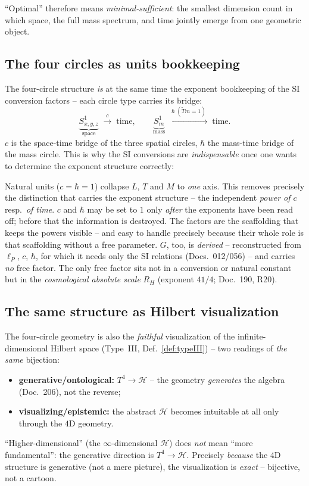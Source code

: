 \noindent
\enquote{Optimal} therefore means \emph{minimal-sufficient}: the smallest
dimension count in which space, the full mass spectrum, and time jointly emerge
from one geometric object.

\subsection{The four circles as units bookkeeping}

The four-circle structure \emph{is} at the same time the exponent bookkeeping of
the SI conversion factors -- each circle type carries its bridge:
\[
  \underbrace{S^1_{x,y,z}}_{\text{space}}
  \;\xrightarrow{\;c\;}\;\text{time},
  \qquad
  \underbrace{S^1_m}_{\text{mass}}
  \;\xrightarrow{\;\hbar\;(\tilde T m=1)\;}\;\text{time}.
\]
$c$ is the space-time bridge of the three spatial circles, $\hbar$ the mass-time
bridge of the mass circle. This is why the SI conversions are \emph{indispensable}
once one wants to determine the exponent structure correctly:

\begin{remark}
Natural units ($c=\hbar=1$) collapse $L$, $T$ and $M$ to \emph{one} axis. This
removes precisely the distinction that carries the exponent structure -- the
independent \emph{power of $c$} resp.\ \emph{of time}. $c$ and $\hbar$ may be set
to $1$ only \emph{after} the exponents have been read off; before that the
information is destroyed. The factors are the scaffolding that keeps the powers
visible -- and easy to handle precisely because their whole role is that
scaffolding without a free parameter. $G$, too, is \emph{derived} -- reconstructed
from $\ell_P$, $c$, $\hbar$, for which it needs only the SI relations
(Docs.~012/056) -- and carries \emph{no} free factor. The only free factor sits
not in a conversion or natural constant but in the \emph{cosmological absolute
scale} $R_H$ (exponent $41/4$; Doc.~190, R20).
\end{remark}

\subsection{The same structure as Hilbert visualization}

The four-circle geometry is also the \emph{faithful} visualization of the
infinite-dimensional Hilbert space (Type~III, Def.~\ref{def:typeIII}) -- two
readings of \emph{the same} bijection:
\begin{itemize}
  \item \textbf{generative/ontological:} $T^4 \to \mathcal{H}$ -- the geometry
  \emph{generates} the algebra (Doc.~206), not the reverse;
  \item \textbf{visualizing/epistemic:} the abstract $\mathcal{H}$ becomes
  intuitable at all only through the $4$D geometry.
\end{itemize}
\enquote{Higher-dimensional} (the $\infty$-dimensional $\mathcal{H}$) does
\emph{not} mean \enquote{more fundamental}: the generative direction is
$T^4 \to \mathcal{H}$. Precisely \emph{because} the $4$D structure is generative
(not a mere picture), the visualization is \emph{exact} -- bijective, not a
cartoon.


